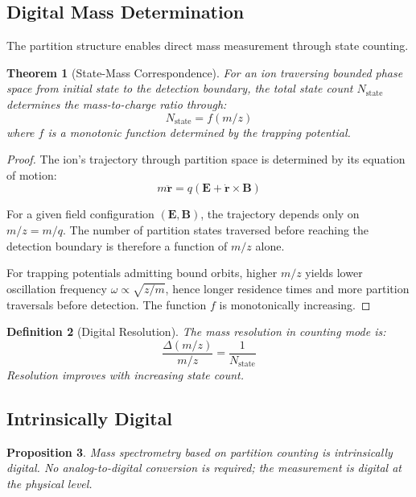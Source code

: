 \documentclass[twocolumn,10pt]{article}
\newtheorem{theorem}{Theorem}[section]
\newtheorem{proposition}[theorem]{Proposition}
\newtheorem{definition}[theorem]{Definition}
\newcommand{\Nstate}{N_{\mathrm{state}}}
\begin{document}
\subsection{Digital Mass Determination}

The partition structure enables direct mass measurement through state counting.

\begin{theorem}[State-Mass Correspondence]
\label{thm:statemass}
For an ion traversing bounded phase space from initial state to the detection boundary, the total state count $\Nstate$ determines the mass-to-charge ratio through:
\begin{equation}
    \Nstate = f(m/z)
\end{equation}
where $f$ is a monotonic function determined by the trapping potential.
\end{theorem}

\begin{proof}
The ion's trajectory through partition space is determined by its equation of motion:
\begin{equation}
    m\ddot{\mathbf{r}} = q(\mathbf{E} + \dot{\mathbf{r}} \times \mathbf{B})
\end{equation}

For a given field configuration $(\mathbf{E}, \mathbf{B})$, the trajectory depends only on $m/z = m/q$. The number of partition states traversed before reaching the detection boundary is therefore a function of $m/z$ alone.

For trapping potentials admitting bound orbits, higher $m/z$ yields lower oscillation frequency $\omega \propto \sqrt{z/m}$, hence longer residence times and more partition traversals before detection. The function $f$ is monotonically increasing.
\end{proof}

\begin{definition}[Digital Resolution]
\label{def:resolution}
The mass resolution in counting mode is:
\begin{equation}
    \frac{\Delta(m/z)}{m/z} = \frac{1}{\Nstate}
\end{equation}
Resolution improves with increasing state count.
\end{definition}

\subsection{Intrinsically Digital}

\begin{proposition}
Mass spectrometry based on partition counting is intrinsically digital. No analog-to-digital conversion is required; the measurement is digital at the physical level.
\end{proposition}
\end{document}
